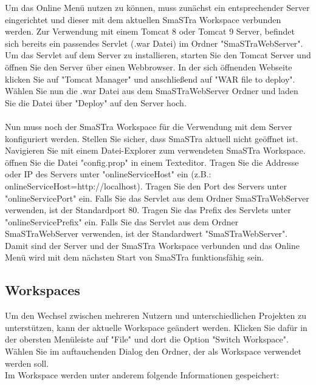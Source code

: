 Um das Online Men\"u nutzen zu k\"onnen, muss zun\"achst ein entsprechender Server eingerichtet und dieser mit dem aktuellen SmaSTra Workspace verbunden werden. Zur Verwendung mit einem Tomcat 8 oder Tomcat 9 Server, befindet sich bereits ein passendes Servlet (.war Datei) im Ordner "SmaSTraWebServer". \\
Um das Servlet auf dem Server zu installieren, starten Sie den Tomcat Server und \"offnen Sie den Server \"uber einen Webbrowser. In der sich \"offnenden Webseite klicken Sie auf "Tomcat Manager" und anschlie{\ss}end auf "WAR file to deploy". W\"ahlen Sie nun die .war Datei aus dem SmaSTraWebServer Ordner und laden Sie die Datei \"uber "Deploy" auf den Server hoch. \\
\\
Nun muss noch der SmaSTra Workspace f\"ur die Verwendung mit dem Server konfiguriert werden. Stellen Sie sicher, dass SmaSTra aktuell nicht ge\"offnet ist. Navigieren Sie mit einem Datei-Explorer zum verwendeten SmaSTra Workspace. \"offnen Sie die Datei "config.prop" in einem Texteditor. Tragen Sie die Addresse oder IP des Servers unter "onlineServiceHost" ein (z.B.: onlineServiceHost=http://localhost). Tragen Sie den Port des Servers unter "onlineServicePort" ein. Falls Sie das Servlet aus dem Ordner SmaSTraWebServer verwenden, ist der Standardport 80.
Tragen Sie das Prefix des Servlets unter "onlineServicePrefix" ein. Falls Sie das Servlet aus dem Ordner SmaSTraWebServer verwenden, ist der Standardwert "SmaSTraWebServer".\\
Damit sind der Server und der SmaSTra Workspace verbunden und das Online Men\"u wird mit dem n\"achsten Start von SmaSTra funktionsf\"ahig sein.

\subsection{Workspaces} \label{sub:Workspaces}
Um den Wechsel zwischen mehreren Nutzern und unterschiedlichen Projekten zu unterst\"utzen, kann der aktuelle Workspace ge\"andert werden. Klicken Sie daf\"ur in der obersten Men\"uleiste auf "File" und dort die Option "Switch Workspace". W\"ahlen Sie im auftauchenden Dialog den Ordner, der als Workspace verwendet werden soll.
\\
Im Workspace werden unter anderem folgende Informationen gespeichert:

